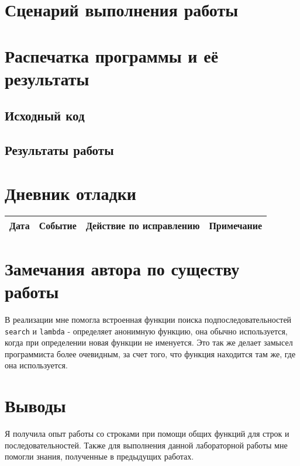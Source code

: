 \documentclass[12pt]{article}
\begin{document}
\section{Сценарий выполнения работы}

\section{Распечатка программы и её результаты}

\subsection{Исходный код}


\subsection{Результаты работы}


\section{Дневник отладки}
\begin{tabular}{|c|c|c|c|}
\hline
Дата & Событие & Действие по исправлению & Примечание \\
\hline
\end{tabular}

\section{Замечания автора по существу работы}
В реализации мне помогла встроенная функции поиска подпоследовательностей  {\tt search} и {\tt lambda} - определяет анонимную функцию, она обычно используется, когда при определении новая функции не именуется. Это так же делает замысел программиста более очевидным, за счет того, что функция находится там же, где она используется.

\section{Выводы}
Я получила опыт работы со строками при помощи общих функций для строк и последовательностей. Также для выполнения данной лабораторной работы мне помогли знания, полученные в предыдущих работах.
\end{document}
